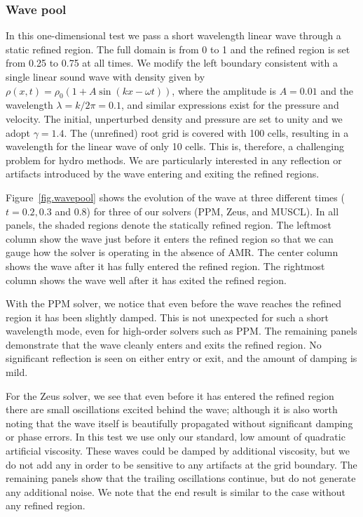 \subsubsection{Wave pool}
\label{sec.tests.wavepool}

In this one-dimensional test we pass a short wavelength linear wave through a static refined region.  The full domain is from 0 to 1 and the refined region is set from 0.25 to 0.75 at all times.  We modify the left boundary consistent with a single linear sound wave with density given by $\rho(x,t) = \rho_0 (1 + A \sin(kx - \omega t))$, where the amplitude is $A = 0.01$ and the wavelength $\lambda = k/2\pi = 0.1$, and similar expressions exist for the pressure and velocity.  The initial, unperturbed density and pressure are set to unity and we adopt $\gamma = 1.4$.  The (unrefined) root grid is covered with 100 cells, resulting in a wavelength for the linear wave of only 10 cells.  This is, therefore, a challenging problem for hydro methods.  We are particularly interested in any reflection or artifacts introduced by the wave entering and exiting the refined regions.

Figure~\ref{fig.wavepool} shows the evolution of the wave at three different times ($t = 0.2, 0.3$ and 0.8) for three of our solvers (PPM, Zeus, and MUSCL).  In all panels, the shaded regions denote the statically refined region. The leftmost column show the wave just before it enters the refined region so that we can gauge how the solver is operating in the absence of AMR.  The center column shows the wave after it has fully entered the refined region.  The rightmost column shows the wave well after it has exited the refined region.

With the PPM solver, we notice that even before the wave reaches the refined region it has been slightly damped. This is not unexpected for such a short wavelength mode, even for high-order solvers such as PPM.  The remaining panels demonstrate that the wave cleanly enters and exits the refined region.  No significant reflection is seen on either entry or exit, and the amount of damping is mild.

For the Zeus solver, we see that even before it has entered the refined region there are small oscillations excited behind the wave; although it is also worth noting that the wave itself is beautifully propagated without significant damping or phase errors.  In this test we use only our standard, low amount of quadratic artificial viscosity.  These waves could be damped by additional viscosity, but we do not add any in order to be sensitive to any artifacts at the grid boundary.  The remaining panels show that the trailing oscillations continue, but do not generate any additional noise. We note that the end result is similar to the case without any refined region.

